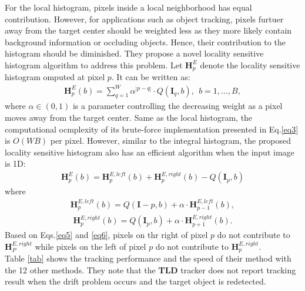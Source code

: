 \documentclass[10pt,twocolumn,letterpaper]{article}
\begin{document}
For the local histogram, pixels inside a local neighborhood has equal contribution. However, for applications such as object tracking, pixels furtuer away from the target center should be weighted less as they more likely contain background information or occluding objects. Hence, their contribution to the histogram should be diminished. They propose a novel locality sensitive histogram algorithm to address this problem. Let $\mathbf{H}_p^E$ denote the locality sensitive histogram omputed at pixel $p$. It can be written as:\\
\begin{gather}
\mathbf{H}_p^E(b) = \sum_{q=1}^W\alpha^{|p-q|} \cdot Q(\mathbf{I}_q,b),~~b = 1,\dots,B,
\label{eq3}
\end{gather}
where $\alpha \in (0,1)$ is a parameter controlling the decreasing weight as a pixel moves away from the target center. Same as the local histogram, the computational ocmplexity of its brute-force implementation presented in Eq.\ref{eq3} is $O(WB)$ per pixel. However, similar to the integral histogram, the proposed locality sensitive histogram also has an efficient algorithm when the input image is 1D:\\
\begin{gather}
\mathbf{H}_p^E(b) = \mathbf{H}_p^{E,left}(b) + \mathbf{H}_p^{E,right}(b) - Q(\mathbf{I}_p,b)
\end{gather}
where\\
\begin{gather}
\mathbf{H}_p^{E,left}(b) = Q(\mathbf{I}-p,b) + \alpha \cdot \mathbf{H}_{p-1}^{E,left}(b),
\label{eq5}
\end{gather}
\begin{gather}
\mathbf{H}_p^{E,right}(b) = Q(\mathbf{I}_p,b) + \alpha \cdot \mathbf{H}_{p+1}^{E,right}(b).
\label{eq6}
\end{gather}
Based on Eqs.\ref{eq5} and \ref{eq6}, pixels on thr right of pixel $p$ do not contribute to $\mathbf{H}_P^{E,right}$ while pixels on the left of pixel $p$ do not contribute to $\mathbf{H}_p^{E,right}$. \\

Table \ref{tab} shows the tracking performance and the speed of their method with the 12 other methods. They note that the {\bf TLD} tracker does not report tracking result when the drift problem occurs and the target object is redetected. 

{\small


}
\end{document}
